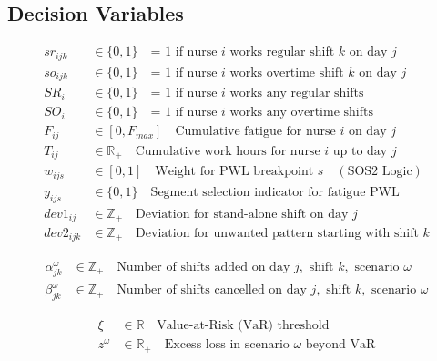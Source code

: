 \documentclass[12pt,a4paper]{article}
\begin{document}
\subsection{Decision Variables}

\begin{tcolorbox}[title=Stage 1 Variables (First-Stage)]
\begin{align*}
sr_{ijk} &\in \{0,1\} \quad \text{= 1 if nurse } i \text{ works regular shift } k \text{ on day } j \\
so_{ijk} &\in \{0,1\} \quad \text{= 1 if nurse } i \text{ works overtime shift } k \text{ on day } j \\
SR_i &\in \{0,1\} \quad \text{= 1 if nurse } i \text{ works any regular shifts} \\
SO_i &\in \{0,1\} \quad \text{= 1 if nurse } i \text{ works any overtime shifts} \\
F_{ij} &\in [0, F_{max}] \quad \text{Cumulative fatigue for nurse } i \text{ on day } j \\
T_{ij} &\in \mathbb{R}_+ \quad \text{Cumulative work hours for nurse } i \text{ up to day } j \\
w_{ijs} &\in [0,1] \quad \text{Weight for PWL breakpoint } s \quad (\text{SOS2 Logic}) \\
y_{ijs} &\in \{0,1\} \quad \text{Segment selection indicator for fatigue PWL} \\
dev1_{ij} &\in \mathbb{Z}_+ \quad \text{Deviation for stand-alone shift on day } j \\
dev2_{ijk} &\in \mathbb{Z}_+ \quad \text{Deviation for unwanted pattern starting with shift } k
\end{align*}
\end{tcolorbox}

\begin{tcolorbox}[title=Stage 2 Variables (Recourse)]
\begin{align*}
\alpha_{jk}^\omega &\in \mathbb{Z}_+ \quad \text{Number of shifts added on day } j, \text{ shift } k, \text{ scenario } \omega \\
\beta_{jk}^\omega &\in \mathbb{Z}_+ \quad \text{Number of shifts cancelled on day } j, \text{ shift } k, \text{ scenario } \omega
\end{align*}
\end{tcolorbox}

\begin{tcolorbox}[title=CVaR Variables]
\begin{align*}
\xi &\in \mathbb{R} \quad \text{Value-at-Risk (VaR) threshold} \\
z^\omega &\in \mathbb{R}_+ \quad \text{Excess loss in scenario } \omega \text{ beyond VaR}
\end{align*}
\end{tcolorbox}
\end{document}
